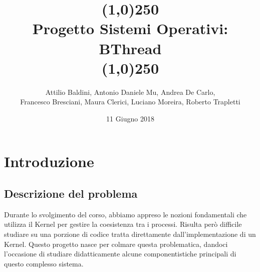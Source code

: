 \documentclass{article}
\newcommand{\pppTitolo}{Progetto Sistemi Operativi: BThread}
\newcommand{\pppSpace}{\newline\vspace{0.5mm}\newline\noindent}
\begin{document}
 \begin{titlepage} 
 \title{\line(1,0){250}\\\pppTitolo\\\line(1,0){250}}
 \thispagestyle{empty}
 \author{Attilio Baldini, Antonio Daniele Mu, Andrea De Carlo, \\Francesco Bresciani, Maura Clerici, Luciano Moreira, Roberto Trapletti}
 \date{11 Giugno 2018}
 \maketitle
 \vspace{10mm}
 
\clearpage
\end{titlepage}

\tableofcontents

\clearpage



\section{Introduzione}
\vspace{5mm}
\subsection{Descrizione del problema}
\vspace{2mm}

Durante lo svolgimento del corso, abbiamo appreso le nozioni fondamentali che utilizza il Kernel per gestire la coesistenza tra i processi. Risulta però difficile studiare su una porzione di codice tratta direttamente dall'implementazione di un Kernel.
\pppSpace
Questo progetto nasce per colmare questa problematica, dandoci l'occasione di studiare didatticamente alcune componentistiche principali di questo complesso sistema.
\end{document}

